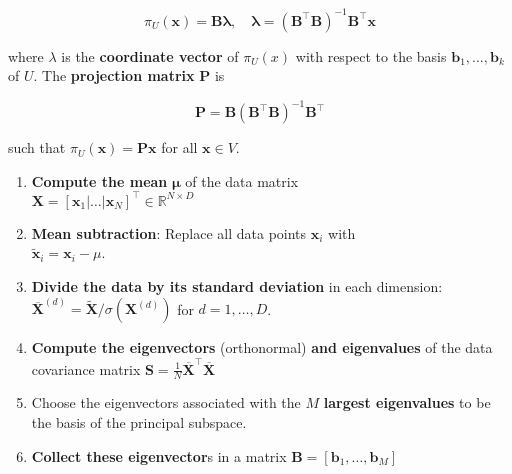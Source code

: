 \documentclass[10pt,a4paper]{Template}
\begin{document}
\begin{minipage}{0.48\textwidth}
\[
\pi_{U}(\boldsymbol{x}) =\boldsymbol{B} \boldsymbol{\lambda}, \quad \boldsymbol{\lambda}=\left(\boldsymbol{B}^{\top} \boldsymbol{B}\right)^{-1} \boldsymbol{B}^{\top} \boldsymbol{x} 
\]

where $\lambda$ is the \textbf{coordinate vector} of $\pi_{U}(x)$ with respect to the basis $\boldsymbol{b}_{1}, \ldots, \boldsymbol{b}_{k}$ of $U$. The \textbf{projection matrix} $\boldsymbol{P}$ is

\[
\boldsymbol{P}=\boldsymbol{B}\left(\boldsymbol{B}^{\top} \boldsymbol{B}\right)^{-1} \boldsymbol{B}^{\top}
\]

such that $\pi_{U}(\boldsymbol{x})=\boldsymbol{P} \boldsymbol{x}$ for all $\boldsymbol{x} \in V$.

\vspace{0.5cm}



\vspace{0.15cm}

\begin{enumerate}
    \item \textbf{Compute the mean} $\boldsymbol{\mu}$ of the data matrix \\ $\boldsymbol{X}=\left[\boldsymbol{x}_{1}|\ldots| \boldsymbol{x}_{N}\right]^{\top} \in \mathbb{R}^{N \times D}$

    \item \textbf{Mean subtraction}: Replace all data points $\boldsymbol{x}_{i}$ with \\ $\tilde{\boldsymbol{x}}_{i}=\boldsymbol{x}_{i}-\mu$.

    \item \textbf{Divide the data by its standard deviation} in each dimension: $\overline{\boldsymbol{X}}^{(d)}=\tilde{\boldsymbol{X}} / \sigma\left(\boldsymbol{X}^{(d)}\right)$ for $d=1, \ldots, D$.

    \item \textbf{Compute the eigenvectors} (orthonormal) \textbf{and eigenvalues} of the data covariance matrix $\boldsymbol{S}=\frac{1}{N} \overline{\boldsymbol{X}}^{\top} \overline{\boldsymbol{X}}$

    \item Choose the eigenvectors associated with the $M$ \textbf{largest eigenvalues} to be the basis of the principal subspace.

    \item \textbf{Collect these eigenvector}s in a matrix $\boldsymbol{B}=\left[\boldsymbol{b}_{1}, \ldots, \boldsymbol{b}_{M}\right]$


\end{enumerate}
\end{minipage}
\end{document}

